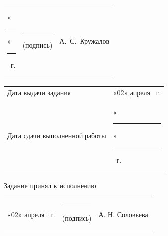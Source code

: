 \documentclass[14pt, a4paper]{extarticle}
\begin{document}
{
\renewcommand{\arraystretch}{2}
\noindent
\begin{tabularx}{\textwidth}{@{} P{0.45\textwidth} P{0.3\textwidth} P{0.25\textwidth} @{}}

    «\rule{0.8cm}{0.4pt}» \quad \rule{2cm}{0.4pt} ~г. &
    \centering \rule{3.5cm}{0.4pt} \par \footnotesize (подпись) &
    \hfill А.~С.~Кружалов                                         \\
\end{tabularx}

\begin{tabularx}{\textwidth}{@{} P{0.45\textwidth} P{0.55\textwidth} @{}}
    Дата выдачи задания           &
    \hfill «\underline{02}» \quad \underline{апреля} ~г. \\

    Дата сдачи выполненной работы &
    \hfill «\rule{0.8cm}{0.4pt}» \quad \rule{2cm}{0.4pt} ~г. \\
\end{tabularx}
}

Задание принял к исполнению

{
\renewcommand{\arraystretch}{1.5}
\begin{tabularx}{\textwidth}{@{} P{0.45\textwidth} P{0.3\textwidth} P{0.25\textwidth} @{}}

    «\underline{02}» \quad \underline{апреля} ~г. &
    \centering \rule{3.5cm}{0.4pt} \par \footnotesize (подпись) &
    \hfill А. Н. Соловьева                                           \\
\end{tabularx}
}
\end{document}
